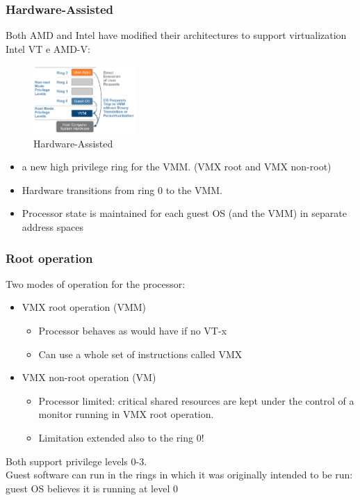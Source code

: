 \documentclass[10pt, oneside]{article}
\begin{document}
\subsubsection{Hardware-Assisted}
Both AMD and Intel have modified their architectures to support virtualization Intel VT e AMD-V:\begin{multicols}{2}
    \begin{figure}[H]
        \begin{center}
        \includegraphics[width=0.35\textwidth]{img/img48.png}
        \caption{Hardware-Assisted}
        \label{fig:Hardware-Assisted}
        \end{center}
    \end{figure}\columnbreak
    \begin{itemize}
        \item a new high privilege ring for the VMM. (VMX root and VMX non-root)
        \item Hardware transitions from ring 0 to the VMM.
        \item Processor state is maintained
        for each guest OS (and the VMM) in separate
        address spaces
    \end{itemize}
\end{multicols}
\subsubsection{Root operation}
Two modes of operation for the processor:\begin{itemize}
    \item VMX root operation (VMM)\begin{itemize}
        \item Processor behaves as would have if no VT-x
        \item Can use a whole set of instructions called VMX
    \end{itemize}
    \item VMX non-root operation (VM)\begin{itemize}
        \item Processor limited: critical shared resources are kept under the control
        of a monitor running in VMX root operation.
        \item Limitation extended also to the ring 0!   
    \end{itemize}
\end{itemize}
Both support privilege levels 0-3.\\
Guest software can run in the rings in which it was originally intended to be run: guest OS believes it is running at level 0
\end{document}
